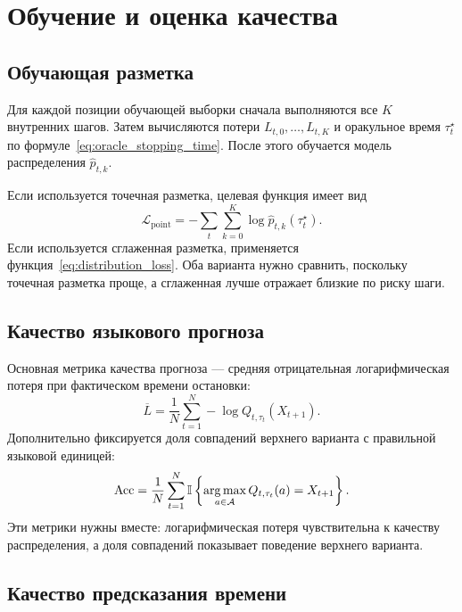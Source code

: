 \section{Обучение и оценка качества}

\subsection{Обучающая разметка}

Для каждой позиции обучающей выборки сначала выполняются все \(K\) внутренних шагов. Затем
вычисляются потери \(L_{t,0},\ldots,L_{t,K}\) и оракульное время \(\tau_t^\star\) по
формуле~\eqref{eq:oracle_stopping_time}. После этого обучается модель распределения \(\widehat
p_{t,k}\).

Если используется точечная разметка, целевая функция имеет вид
\begin{equation}
  \mathcal L_{\mathrm{point}}
  =-\sum_t\sum_{k=0}^{K}\log \widehat p_{t,k}(\tau_t^\star).
  \label{eq:point_loss}
\end{equation}
Если используется сглаженная разметка, применяется функция~\eqref{eq:distribution_loss}. Оба
варианта нужно сравнить, поскольку точечная разметка проще, а сглаженная лучше отражает близкие по
риску шаги.

\subsection{Качество языкового прогноза}

Основная метрика качества прогноза --- средняя отрицательная логарифмическая потеря при
фактическом времени остановки:
\begin{equation}
  \overline L=\frac{1}{N}\sum_{t=1}^{N}-\log Q_{t,\tau_t}(X_{t+1}).
  \label{eq:mean_nll}
\end{equation}
Дополнительно фиксируется доля совпадений верхнего варианта с правильной языковой единицей:
\begin{equation}
  \mathrm{Acc}=\frac{1}{N}\sum_{t=1}^{N}
  \mathbb{I}\left\{\operatorname*{arg\,max}_{a\in\mathcal{A}}Q_{t,\tau_t}(a)=X_{t+1}\right\}.
  \label{eq:accuracy}
\end{equation}
Эти метрики нужны вместе: логарифмическая потеря чувствительна к качеству распределения, а доля
совпадений показывает поведение верхнего варианта.

\subsection{Качество предсказания времени}

